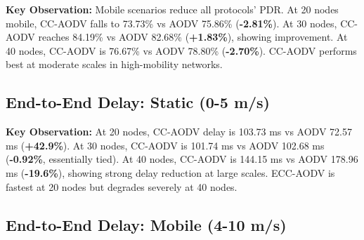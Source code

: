 \documentclass[12pt]{article}
\begin{document}
\textbf{Key Observation:} Mobile scenarios reduce all protocols' PDR. At 20 nodes mobile, CC-AODV falls to 73.73\% vs AODV 75.86\% (\textbf{-2.81\%}). At 30 nodes, CC-AODV reaches 84.19\% vs AODV 82.68\% (\textbf{+1.83\%}), showing improvement. At 40 nodes, CC-AODV is 76.67\% vs AODV 78.80\% (\textbf{-2.70\%}). CC-AODV performs best at moderate scales in high-mobility networks.

\pagebreak

\subsection*{End-to-End Delay: Static (0-5 m/s)}

\begin{center}
\end{center}

\textbf{Key Observation:} At 20 nodes, CC-AODV delay is 103.73 ms vs AODV 72.57 ms (\textbf{+42.9\%}). At 30 nodes, CC-AODV is 101.74 ms vs AODV 102.68 ms (\textbf{-0.92\%}, essentially tied). At 40 nodes, CC-AODV is 144.15 ms vs AODV 178.96 ms (\textbf{-19.6\%}), showing strong delay reduction at large scales. ECC-AODV is fastest at 20 nodes but degrades severely at 40 nodes.

\pagebreak

\subsection*{End-to-End Delay: Mobile (4-10 m/s)}
\end{document}
